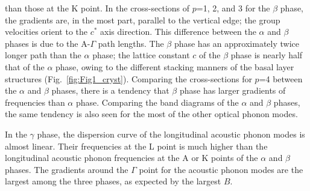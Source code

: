 \documentclass[twocolumn,amsmath,amssymb,a4paper,prb,superscriptaddress,floatfix]{revtex4-1}
\begin{document}
\noindent
than those at the K point.
In the cross-sections of $p$=1, 2, and 3 for the $\beta$ phase, the gradients 
are, in the most part, parallel to the vertical edge; the
group velocities orient to the $c^*$ axis direction.
This difference between the $\alpha$ and $\beta$ phases is
due to the A-$\Gamma$ path lengths. The $\beta$ phase has an approximately twice
longer path than the $\alpha$ phase; the lattice constant $c$ of the $\beta$
phase is nearly half that of the $\alpha$ phase, owing to the different stacking
manners of the basal layer structures (Fig.~\ref{fig:Fig1_cryst}). 
Comparing the cross-sections for $p$=4 between the $\alpha$ and $\beta$ phases, there is a
tendency that $\beta$ phase has larger gradients of frequencies than $\alpha$ phase.
Comparing the band diagrams of the $\alpha$ and $\beta$ phases, the same
tendency is also seen for the most of the other optical phonon modes.

In the $\gamma$ phase, the dispersion curve of the longitudinal acoustic phonon
modes is almost linear. Their frequencies at the L point is much higher
than the longitudinal acoustic phonon frequencies at the A or K points of the
$\alpha$ and $\beta$ phases.  The gradients around the $\Gamma$ point for the
acoustic phonon modes  are
the largest among the three phases, as expected by the largest $B$.

\onecolumngrid
\end{document}
